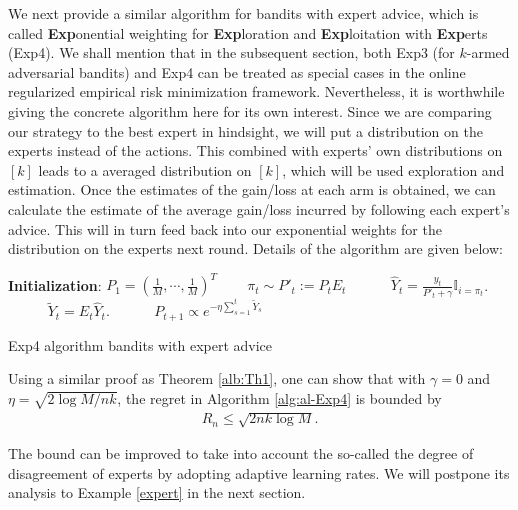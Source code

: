 \documentclass[10pt,a4article]{article}
\numberwithin{equation}{section}
\theoremstyle{plain}
\theoremstyle{definition}
\begin{document}
We next provide a similar algorithm for bandits with expert advice, which is called \textbf{Exp}onential weighting for \textbf{Exp}loration and \textbf{Exp}loitation with \textbf{Exp}erts (Exp4). We shall mention that in the subsequent section, both Exp3 (for $k$-armed adversarial bandits) and Exp4 can be treated as special cases in the online regularized empirical risk minimization framework. 
Nevertheless, it is worthwhile giving the concrete algorithm here for its own interest. 
Since we are comparing our strategy to the best expert in hindsight, we will put a distribution on the experts instead of the actions. This combined with experts' own distributions on $[k]$ leads to a averaged distribution on $[k]$, which will be used exploration and estimation. Once the estimates of the gain/loss at each arm is obtained, we can calculate the estimate of the average gain/loss incurred by following each expert's advice. This will in turn feed back into our exponential weights for the distribution on the experts next round. Details of the algorithm are given below:


\begin{algorithm}[H]
 \begin{algorithmic}[1]
 \STATE \textbf{Initialization}: $P_1 = (\frac{1}{M}, \cdots, \frac{1}{M})^T$ \ \ \ 
 \STATE $\pi_t\sim P'_t := P_tE_t$  \ \ \ \ \ 
 \STATE $\displaystyle\hat{Y}_t = \frac{y_t}{P'_t+\gamma}\mathbb I_{i=\pi_t}$. \ \ \ \ \ 
 \STATE $\displaystyle\tilde{Y}_t = E_t\hat{Y}_t$. \ \ \ \ \ 
 \STATE $P_{t+1}\propto e^{-\eta\sum_{s=1}^t\tilde{Y}_s}$ \ \ \ \ \ 
\ENDFOR
\end{algorithmic}
\caption{Exp4 algorithm bandits with expert advice} 
\label{alg:al-Exp4}
\end{algorithm}

Using a similar proof as Theorem \ref{alb:Th1}, one can show that with $\gamma = 0$ and $\eta = \sqrt{2\log M /nk}$, the regret in Algorithm \ref{alg:al-Exp4} is bounded by 
\begin{align*}
R_n \leq \sqrt{2nk\log M}. 
\end{align*}

The bound can be improved to take into account the so-called the degree of disagreement of experts by adopting adaptive learning rates. We will postpone its analysis to Example \ref{expert} in the next section. 
\end{document}

